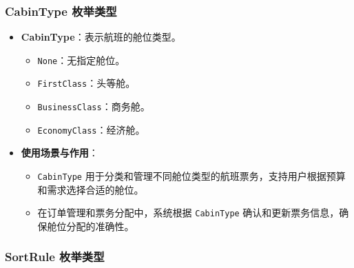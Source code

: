 \documentclass[UTF8, a4paper,12pt]{ctexart}
\begin{document}
\subsubsection{CabinType 枚举类型}

\begin{itemize}
    \item \textbf{CabinType}：表示航班的舱位类型。
    \begin{itemize}
        \item \texttt{None}：无指定舱位。
        \item \texttt{FirstClass}：头等舱。
        \item \texttt{BusinessClass}：商务舱。
        \item \texttt{EconomyClass}：经济舱。
    \end{itemize}
    \item \textbf{使用场景与作用}：
    \begin{itemize}
        \item \texttt{CabinType} 用于分类和管理不同舱位类型的航班票务，支持用户根据预算和需求选择合适的舱位。
        \item 在订单管理和票务分配中，系统根据 \texttt{CabinType} 确认和更新票务信息，确保舱位分配的准确性。
    \end{itemize}
\end{itemize}

\subsubsection{SortRule 枚举类型}
\end{document}
